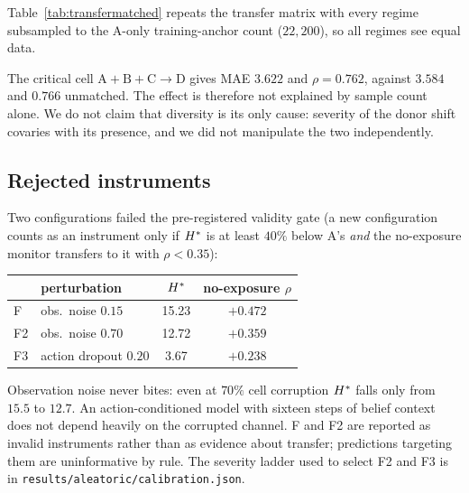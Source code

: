 Table~\ref{tab:transfermatched} repeats the transfer matrix with every regime subsampled to the
A-only training-anchor count ($22{,}200$), so all regimes see equal data.

\begin{table}[h]
\centering\small

\caption{Size-matched control for Table~\ref{tab:transfer}. Spearman $\rho$, mean over three
seeds; italic entries are configurations seen in training.}
\label{tab:transfermatched}
\end{table}

The critical cell $\mathrm{A{+}B{+}C}\to$D gives MAE $3.622$ and $\rho = 0.762$, against
$3.584$ and $0.766$ unmatched. The effect is therefore not explained by sample count alone. We
do not claim that diversity is its only cause: severity of the donor shift covaries with its
presence, and we did not manipulate the two independently.

\subsection{Rejected instruments}

Two configurations failed the pre-registered validity gate (a new configuration counts as an
instrument only if $H^{*}$ is at least $40\%$ below A's \emph{and} the no-exposure monitor
transfers to it with $\rho < 0.35$):

\begin{center}\small
\begin{tabular}{llcc}
\toprule
& perturbation & $H^{*}$ & no-exposure $\rho$ \\
\midrule
F  & obs.\ noise $0.15$ & 15.23 & $+0.472$ \\
F2 & obs.\ noise $0.70$ & 12.72 & $+0.359$ \\
F3 & action dropout $0.20$ & \phantom{0}3.67 & $+0.238$ \\
\bottomrule
\end{tabular}
\end{center}

Observation noise never bites: even at $70\%$ cell corruption $H^{*}$ falls only from $15.5$
to $12.7$. An action-conditioned model with sixteen steps of belief context does not depend
heavily on the corrupted channel. F and F2 are reported as invalid instruments rather than as
evidence about transfer; predictions targeting them are uninformative by rule. The severity
ladder used to select F2 and F3 is in \texttt{results/aleatoric/calibration.json}.

